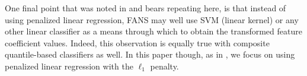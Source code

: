 One final point that was noted in \cite{fan2016} and bears repeating here, is
that instead of using penalized linear regression, FANS may well use SVM (linear
kernel) or any other linear classifier as a means through which to obtain the
transformed feature coefficient values.  Indeed, this observation is equally
true with composite quantile-based classifiers as well.  In this paper though,
as in \cite{fan2016}, we focus on using penalized linear regression with the
$\ell_1$ penalty.









